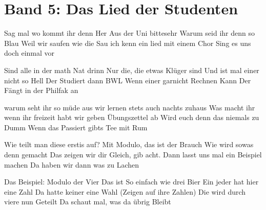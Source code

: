 
\newpage
\section{Band 5: Das Lied der Studenten}
\label{sec:schluempfe}
\charaktere{\Chor \Sing}

    

\begin{verseplay}[10em]
\s{\Sing}Sag mal wo kommt ihr denn Her
\s{\Chor} Aus der Uni bittesehr
\s{\Sing}Warum seid ihr denn so Blau
\s{\Chor} Weil wir saufen wie die Sau
\s{\Sing}ich kenn ein lied mit einem Chor
\s{\Chor} Sing es uns doch einmal vor

\end{verseplay}
\begin{verseplay}[10em]


\s{\Sing}Sind alle in der math Nat drinn
\s{\Chor} Nur die, die etwas Klüger sind
\s{\Sing}Und ist mal einer nicht so Hell
\s{\Chor} Der Studiert dann BWL
\s{\Sing}Wenn einer garnicht Rechnen Kann
\s{\Chor} Der Fängt in der Philfak an

\end{verseplay}
\begin{verseplay}[10em]


\s{\Sing}warum seht ihr so müde aus
\s{\Chor} wir lernen stets auch nachts zuhaus
\s{\Sing}Was macht ihr wenn ihr freizeit habt
\s{\Chor} wir geben Übungszettel ab 
\s{\Sing}Wird euch denn das niemals zu Dumm
\s{\Chor} Wenn das Passiert gibts Tee mit Rum

\end{verseplay}
\begin{verseplay}[10em]


\s{\Sing}Wie teilt man diese erstis auf?
\s{\Chor} Mit Modulo, das ist der Brauch
\s{\Sing}Wie wird sowas denn gemacht
\s{\Chor} Das zeigen wir dir Gleich, gib acht.
\s{\Sing}Dann lasst uns mal ein Beispiel machen
\s{\Chor} Da haben wir dann was zu Lachen

\end{verseplay}
\begin{verseplay}[10em]

\s{\Sing}Das Beispiel: Modulo der Vier
\s{\Chor} Das ist So einfach wie drei Bier
\s{\Sing}Ein jeder hat hier eine Zahl
\s{\Chor} Da hatte keiner eine Wahl (Zeigen auf ihre Zahlen)
\s{\Sing}Die wird durch viere nun Geteilt
\s{\Chor} Da schaut mal, was da übrig Bleibt

\end{verseplay}
